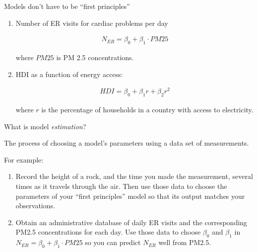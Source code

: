 \documentclass[aspectratio=169]{beamer}
\begin{document}
\begin{frame}{Models don't have to be ``first principles''}

\begin{enumerate}

\item Number of ER visits for cardiac problems per day

\begin{align*}
N_{ER} = \beta_0+ \beta_1\cdot PM25
\end{align*}

where $PM25$ is PM 2.5 concentrations.

\item HDI as a function of energy access:

\begin{align*}
HDI = \beta_0 + \beta_1 r + \beta_2 r^2
\end{align*}

where $r$ is the percentage of households in a country with access to electricity.
\end{enumerate}

\end{frame}



\begin{frame}{What is model \textit{estimation}?}

\pause

The process of choosing a model's parameters using a data set of measurements.  

\pause
\hspace{5mm}

For example:

\begin{enumerate}
\item Record the height of a rock, and the time you made the measurement, several times as it travels through the air.  Then use those data to choose the parameters of your ``first principles'' model so that its output matches your observations.

\hspace{5mm}

\item Obtain an administrative database of daily ER visits and the corresponding PM2.5 concentrations for each day.  Use those data to choose $\beta_0$ and $\beta_1$ in $
N_{ER} = \beta_0+\beta_1\cdot PM25$ so you can predict $N_{ER}$ well from PM2.5.  
\end{enumerate}

\end{frame}
\end{document}
